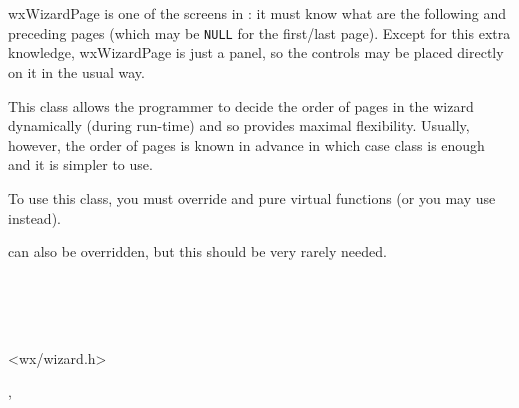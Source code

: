 
\section{}\label{wxwizardpage}

wxWizardPage is one of the screens in : it must
know what are the following and preceding pages (which may be {\tt NULL} for the
first/last page). Except for this extra knowledge, wxWizardPage is just a
panel, so the controls may be placed directly on it in the usual way.

This class allows the programmer to decide the order of pages in the wizard
dynamically (during run-time) and so provides maximal flexibility. Usually,
however, the order of pages is known in advance in which case 
 class is enough and it is simpler
to use.


To use this class, you must override  
and  pure virtual functions (or you
may use  instead).

 can also be overridden, but this
should be very rarely needed.


\\
\\
\\


<wx/wizard.h>


, 


